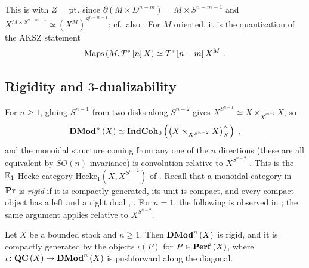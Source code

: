 This is \cite[Corollary 1.3.12]{HoLi} with $Z=\text{pt}$, since
$\partial\left(M\times D^{n-m}\right)=M\times S^{n-m-1}$ and
$X^{M\times S^{n-m-1}}\simeq\left(X^M\right)^{S^{n-m-1}}$; cf.\ also \cite[Claim 3.1 and
Theorem 5.3]{Ber:Sph}. For $M$ oriented, it is the quantization of the AKSZ
statement \cite{PTVV}
\begin{equation*}
\operatorname{Maps}\left(M , T^*\left[n\right]X\right) \simeq T^*\left[n-m\right]X^M \ .
\end{equation*}

\subsection{Rigidity and \texorpdfstring{$3$}{3}-dualizability}
\label{sec:rigid}

For $n\geq 1$, gluing $S^{n-1}$ from two disks along $S^{n-2}$ gives
$X^{S^{n-1}}\simeq X\times_{X^{S^{n-2}}}X$, so
\begin{equation*}
\mathbf{DMod}^n\left(X\right)\simeq\mathbf{IndCoh}_0\left(\left(X\times_{X^{S^{n-2}}}X\right)^\wedge_X\right) \ ,
\end{equation*}
and the monoidal structure coming from any one of the $n$ directions (these are all equivalent
by $SO\left(n\right)$-invariance) is convolution relative to $X^{S^{n-2}}$ \cite{Ber:center}.
This is the $\mathbb{E}_1$-Hecke category $\mathrm{Hecke}_1\left(X,X^{S^{n-2}}\right)$ of \cite{HoLi}.
Recall that a monoidal category in $\mathbf{Pr}$ is \emph{rigid} if it is compactly generated, its
unit is compact, and every compact object has a left and a right dual
\cite[Chapter 1, Section 9]{GR:v1}, \cite{G:ShvCat}.
For $n=1$, the following is observed in \cite{Ber:center}; the same argument applies relative
to $X^{S^{n-2}}$.

\begin{prop}
\label{prop:rigid}
Let $X$ be a bounded stack and $n\geq1$. Then
$\mathbf{DMod}^n\left(X\right)$ is rigid, and it is compactly generated by the objects
$\iota\left(P\right)$ for $P\in\mathbf{Perf}\left(X\right)$, where
$\iota\colon\mathbf{QC}\left(X\right)\to\mathbf{DMod}^n\left(X\right)$ is pushforward along the diagonal.
\end{prop}

